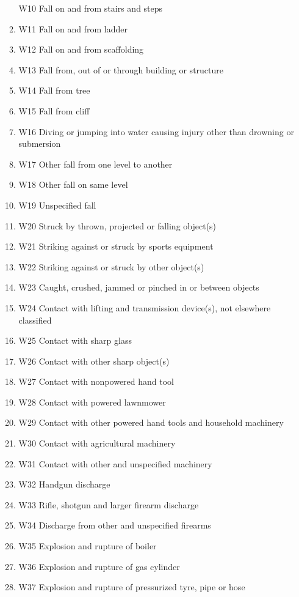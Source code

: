 \documentclass[
]{scrartcl}
\begin{document}
\begin{itemize}
\begin{enumerate}
    W10 Fall on and from stairs and steps
  \item
    W11 Fall on and from ladder
  \item
    W12 Fall on and from scaffolding
  \item
    W13 Fall from, out of or through building or structure
  \item
    W14 Fall from tree
  \item
    W15 Fall from cliff
  \item
    W16 Diving or jumping into water causing injury other than drowning
    or submersion
  \item
    W17 Other fall from one level to another
  \item
    W18 Other fall on same level
  \item
    W19 Unspecified fall
  \item
    W20 Struck by thrown, projected or falling object(s)
  \item
    W21 Striking against or struck by sports equipment
  \item
    W22 Striking against or struck by other object(s)
  \item
    W23 Caught, crushed, jammed or pinched in or between objects
  \item
    W24 Contact with lifting and transmission device(s), not elsewhere
    classified
  \item
    W25 Contact with sharp glass
  \item
    W26 Contact with other sharp object(s)
  \item
    W27 Contact with nonpowered hand tool
  \item
    W28 Contact with powered lawnmower
  \item
    W29 Contact with other powered hand tools and household machinery
  \item
    W30 Contact with agricultural machinery
  \item
    W31 Contact with other and unspecified machinery
  \item
    W32 Handgun discharge
  \item
    W33 Rifle, shotgun and larger firearm discharge
  \item
    W34 Discharge from other and unspecified firearms
  \item
    W35 Explosion and rupture of boiler
  \item
    W36 Explosion and rupture of gas cylinder
  \item
    W37 Explosion and rupture of pressurized tyre, pipe or hose

\end{enumerate}
\end{itemize}
\end{document}

